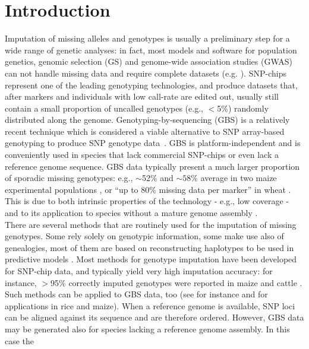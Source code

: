 \section{Introduction}
\label{intro}

Imputation of missing alleles and genotypes is usually a preliminary step for
a wide range of genetic analyses: in fact, most models and software for 
population genetics, genomic selection (GS) and genome-wide association 
studies (GWAS) can not handle missing data and require complete datasets (e.g. \cite{hayes2009invited}). 
SNP-chips represent one of the leading genotyping technologies, and produce 
datasets that, after markers and individuals with low call-rate are edited out, 
usually still contain a small proportion of uncalled genotypes (e.g., $<$5\%) 
randomly distributed along the genome. Genotyping-by-sequencing (GBS) is a 
relatively recent technique which is considered a viable alternative to SNP array-based genotyping to produce SNP genotype data~\cite{elshire_robust_2011}.
GBS is platform-independent and is conveniently 
used in species that lack commercial SNP-chips or even lack a reference 
genome sequence. GBS data typically present a much larger proportion of 
sporadic missing genotypes: e.g., $\sim$52\% and $\sim 58\%$ average in two maize experimental populations \cite{crossa_genomic_2013},
or ``up to 80\% missing data per marker'' in wheat \cite{poland_genomic_2012}. This 
is due to both intrinsic properties of the technology - e.g., low coverage - 
and to its application to species without a mature genome assembly \cite{glaubitz_tassel-gbs:_2014}.\\
There are several methods that are routinely used for the imputation of 
missing genotypes. Some rely solely on genotypic information, some make 
use also of genealogies, most of them are based on reconstructing haplotypes 
to be used in predictive models \cite{nicolazzi_software_2015}. Most methods for 
genotype imputation have been developed for SNP-chip data, and typically 
yield very high imputation accuracy: for instance, $>$95\% correctly imputed 
genotypes were reported in maize \cite{hickey_factors_2012} and cattle \cite{vanraden_genomic_2011}. 
Such methods can be applied to GBS data, too (see for instance 
\cite{huang_efficient_2014} and \cite{swarts_novel_2014} 
for applications in rice and maize). When a reference 
genome is available, SNP loci can be aligned against its sequence and 
are therefore ordered. However, GBS data may be generated 
also for species lacking a reference genome assembly. In this case the 
